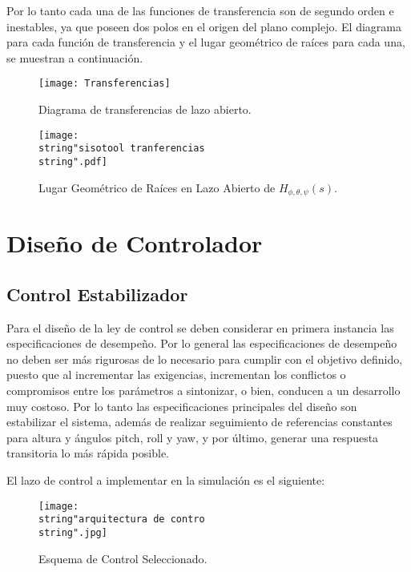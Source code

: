 \documentclass[../main.tex]{subfiles}
\begin{document}
Por lo tanto cada una de las funciones de transferencia son de segundo
orden e inestables, ya que poseen dos polos en el origen del plano
complejo. El diagrama para cada función de transferencia y el lugar
geométrico de raíces para cada una, se muestran a continuación.

\begin{figure}[H]
\noindent \begin{centering}
\texttt{[image: Transferencias]}
\par\end{centering}
\caption{Diagrama de transferencias de lazo abierto.}
\end{figure}

\begin{figure}[H]
\noindent \begin{centering}
\texttt{[image: \\string"sisotool tranferencias\\string".pdf]}
\par\end{centering}
\caption{Lugar Geométrico de Raíces en Lazo Abierto de $H_{\phi,\theta,\psi}(s)$.}
\end{figure}

\section{Diseño de Controlador}

\subsection{Control Estabilizador}

Para el diseño de la ley de control se deben considerar en primera
instancia las especificaciones de desempeño. Por lo general las especificaciones
de desempeño no deben ser más rigurosas de lo necesario para cumplir
con el objetivo definido, puesto que al incrementar las exigencias,
incrementan los conflictos o compromisos entre los parámetros a sintonizar,
o bien, conducen a un desarrollo muy costoso. Por lo tanto las especificaciones
principales del diseño son estabilizar el sistema, además de realizar
seguimiento de referencias constantes para altura y ángulos pitch,
roll y yaw, y por último, generar una respuesta transitoria lo más
rápida posible. 

El lazo de control a implementar en la simulación es el siguiente:

\begin{figure}[H]
\noindent \begin{centering}
\texttt{[image: \\string"arquitectura de contro\\string".jpg]}
\par\end{centering}
\caption{\label{fig:Esquema-de-Com}Esquema de Control Seleccionado.}
\end{figure}
\end{document}
